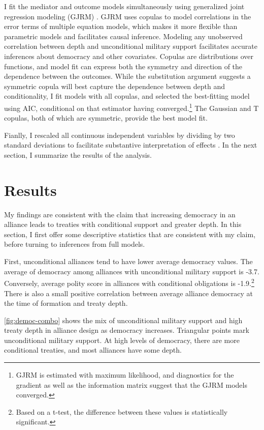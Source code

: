 \documentclass[12pt]{article}
\begin{document}
I fit the mediator and outcome models simultaneously using generalized joint regression modeling (GJRM) \citep{Braumoelleretal2018}.
GJRM uses copulas to model correlations in the error terms of multiple equation models, which makes it more flexible than parametric models and facilitates causal inference. 
Modeling any unobserved correlation between depth and unconditional military support facilitates accurate inferences about democracy and other covariates. 
Copulas are distributions over functions, and model fit can express both the symmetry and direction of the dependence between the outcomes. 
While the substitution argument suggests a symmetric copula will best capture the dependence between depth and conditionality, I fit models with all copulas, and selected the best-fitting model using AIC, conditional on that estimator having converged.\footnote{GJRM is estimated with maximum likelihood, and diagnostics for the gradient as well as the information matrix suggest that the GJRM models converged.} 
The Gaussian and T copulas, both of which are symmetric, provide the best model fit. 


Fianlly, I rescaled all continuous independent variables by dividing by two standard deviations to facilitate substantive interpretation of effects \citep{Gelman2008}. 
In the next section, I summarize the results of the analysis. 



\section{Results}


My findings are consistent with the claim that increasing democracy in an alliance leads to treaties with conditional support and greater depth. 
In this section, I first offer some descriptive statistics that are consistent with my claim, before turning to inferences from full models. 


First, unconditional alliances tend to have lower average democracy values. 
The average of democracy among alliances with unconditional military support is -3.7. 
Conversely, average polity score in alliances with conditional obligations is -1.9.\footnote{Based on a t-test, the difference between these values is statistically significant.} 
There is also a small positive correlation between average alliance democracy at the time of formation and treaty depth. 

\autoref{fig:democ-combo} shows the mix of unconditional military support and high treaty depth in alliance design as democracy increases. 
Triangular points mark unconditional military support. 
At high levels of democracy, there are more conditional treaties, and most alliances have some depth. 
\end{document}

